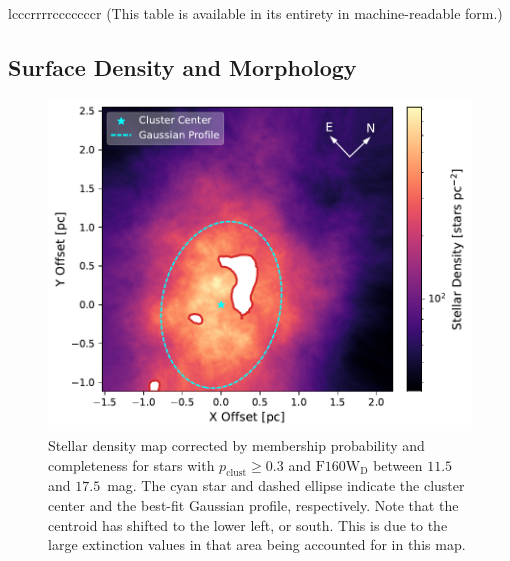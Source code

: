 \documentclass[12pt]{ucsddissertation}
\newcommand{\pclust}{p_{\mathrm{clust}}}
\begin{document}
\begin{CJK*}{UTF8}{gbsn}
\begin{deluxetable}{lcccrrrrcccccccr}
{
(This table is available in its entirety in machine-readable form.)
}
\label{wd1-tab:results}
\end{deluxetable}



\subsection{Surface Density and Morphology}
\label{wd1-subsec:surface_density}
\normalcolor
\begin{figure}[htb!]
    \centering
    \includegraphics[width = 0.7\linewidth]{figures/chapter2/2D_Density_Map_w_ne_log.pdf}
    \caption[Stellar density map corrected by membership probability and completeness]{Stellar density map corrected by membership probability and completeness for stars with $\pclust \geq 0.3$ and $\mathrm{F160W_D}$ between $11.5$ and $17.5$~mag. The cyan star and dashed ellipse indicate the cluster center and the best-fit Gaussian profile, respectively. Note that the centroid has shifted to the lower left, or south. This is due to the large extinction values in that area being accounted for in this map.}
    \label{fig:2D_density_map}
\end{figure}


\end{CJK*}
\end{document}
